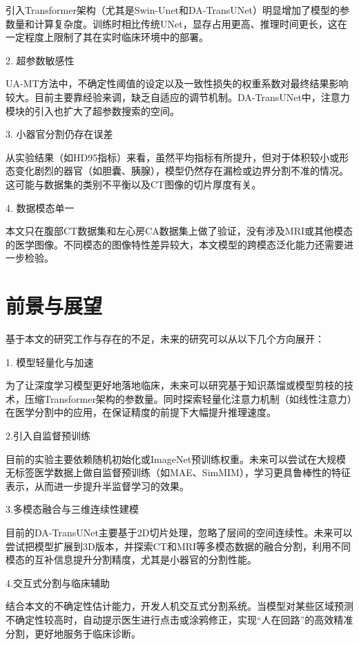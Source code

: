 \documentclass{xduugthesis}
\begin{document}
	引入Transformer架构（尤其是Swin-Unet和DA-TransUNet）明显增加了模型的参数量和计算复杂度。训练时相比传统UNet，显存占用更高、推理时间更长，这在一定程度上限制了其在实时临床环境中的部署。
    
2. 超参数敏感性

	UA-MT方法中，不确定性阈值的设定以及一致性损失的权重系数对最终结果影响较大。目前主要靠经验来调，缺乏自适应的调节机制。DA-TransUNet中，注意力模块的引入也扩大了超参数搜索的空间。
    
3. 小器官分割仍存在误差

	从实验结果（如HD95指标）来看，虽然平均指标有所提升，但对于体积较小或形态变化剧烈的器官（如胆囊、胰腺），模型仍然存在漏检或边界分割不准的情况。这可能与数据集的类别不平衡以及CT图像的切片厚度有关。
    
4. 数据模态单一

	本文只在腹部CT数据集和左心房CA数据集上做了验证，没有涉及MRI或其他模态的医学图像。不同模态的图像特性差异较大，本文模型的跨模态泛化能力还需要进一步检验。

\section{前景与展望}
基于本文的研究工作与存在的不足，未来的研究可以从以下几个方向展开：

1. 模型轻量化与加速

	为了让深度学习模型更好地落地临床，未来可以研究基于知识蒸馏或模型剪枝的技术，压缩Transformer架构的参数量。同时探索轻量化注意力机制（如线性注意力）在医学分割中的应用，在保证精度的前提下大幅提升推理速度。
    
2.引入自监督预训练

	目前的实验主要依赖随机初始化或ImageNet预训练权重。未来可以尝试在大规模无标签医学数据上做自监督预训练（如MAE、SimMIM），学习更具鲁棒性的特征表示，从而进一步提升半监督学习的效果。
    
3.多模态融合与三维连续性建模

	目前的DA-TransUNet主要基于2D切片处理，忽略了层间的空间连续性。未来可以尝试把模型扩展到3D版本，并探索CT和MRI等多模态数据的融合分割，利用不同模态的互补信息提升分割精度，尤其是小器官的分割性能。
    
4.交互式分割与临床辅助

	结合本文的不确定性估计能力，开发人机交互式分割系统。当模型对某些区域预测不确定性较高时，自动提示医生进行点击或涂鸦修正，实现“人在回路”的高效精准分割，更好地服务于临床诊断。
\end{document}
